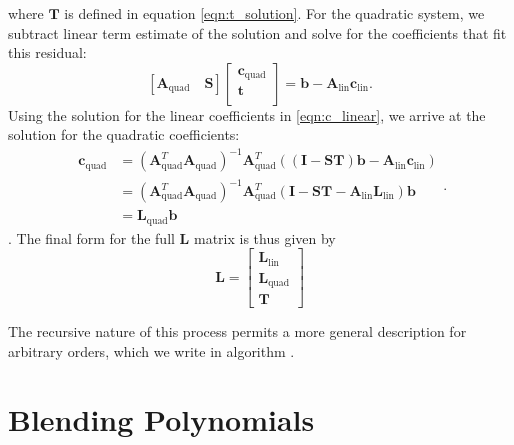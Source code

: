where $\mathbf{T}$ is defined in equation \ref{eqn:t_solution}. For the quadratic system, we subtract linear term estimate of the solution and solve for the coefficients that fit this residual:
\begin{equation}
\label{eqn:fitting_quadratic}
\left[
\mathbf{A}_{\text{quad}} \quad \mathbf{S}
\right]
\left[ \begin{array}{c}
\mathbf{c}_{\text{quad}} \\
\mathbf{t} \\
\end{array} \right] = \mathbf{b} - \mathbf{A}_{\text{lin}}\mathbf{c}_{\text{lin}}
\text{.}
\end{equation}
Using the solution for the linear coefficients in \ref{eqn:c_linear}, we arrive at the solution for the quadratic coefficients:
\begin{equation}
\label{eqn:c_quad}
\begin{split}
\mathbf{c}_{\text{quad}} & = (\mathbf{A}_{\text{quad}}^T\mathbf{A}_{\text{quad}})^{-1}\mathbf{A}_{\text{quad}}^T((\mathbf{I-ST})\mathbf{b} - \mathbf{A}_{\text{lin}}\mathbf{c}_{\text{lin}}) \\
		   & = (\mathbf{A}_{\text{quad}}^T\mathbf{A}_{\text{quad}})^{-1}\mathbf{A}_{\text{quad}}^T(\mathbf{I-ST} - \mathbf{A}_{\text{lin}}\mathbf{L}_{\text{lin}})\mathbf{b} \\
           & = \mathbf{L}_{\text{quad}}\mathbf{b}
\end{split}
\text{.}
\end{equation}.
The final form for the full $\mathbf{L}$ matrix is thus given by
\begin{equation}
\mathbf{L} =
\begin{bmatrix}
\mathbf{L}_{\text{lin}} \\
\mathbf{L}_{\text{quad}} \\
\mathbf{T}
\end{bmatrix}
\end{equation}

The recursive nature of this process permits a more general description for arbitrary orders, which we write in algorithm .



\section{Blending Polynomials}
